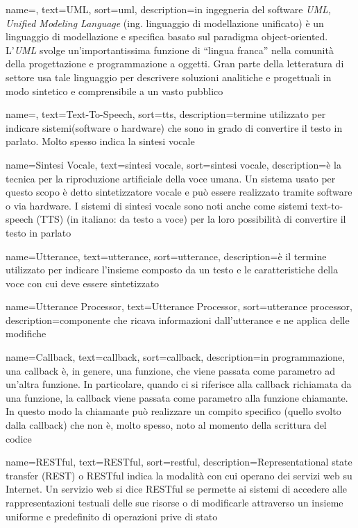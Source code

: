 {
    name=,
    text=UML,
    sort=uml,
    description={in ingegneria del software \emph{UML, Unified Modeling Language} (ing. linguaggio di modellazione unificato) è un linguaggio di modellazione e specifica basato sul paradigma object-oriented. L'\emph{UML} svolge un'importantissima funzione di ``lingua franca'' nella comunità della progettazione e programmazione a oggetti. Gran parte della letteratura di settore usa tale linguaggio per descrivere soluzioni analitiche e progettuali in modo sintetico e comprensibile a un vasto pubblico}
}

{
	name=,
	text=Text-To-Speech,
	sort=tts,
	description={termine utilizzato per indicare sistemi(software o hardware) che sono in grado di convertire il testo in parlato. Molto spesso indica la sintesi vocale}
}

{
	name=Sintesi Vocale,
	text=sintesi vocale,
	sort=sintesi vocale,
	description={è la tecnica per la riproduzione artificiale della voce umana. Un sistema usato per questo scopo è detto sintetizzatore vocale e può essere realizzato tramite software o via hardware. I sistemi di sintesi vocale sono noti anche come sistemi text-to-speech (TTS) (in italiano: da testo a voce) per la loro possibilità di convertire il testo in parlato}
}

{
	name=Utterance,
	text=utterance,
	sort=utterance,
	description={è il termine utilizzato per indicare l'insieme composto da un testo e le caratteristiche della voce con cui deve essere sintetizzato}
}

{
	name=Utterance Processor,
	text=Utterance Processor,
	sort=utterance processor,
	description={componente che ricava informazioni dall'utterance e ne applica delle modifiche}
}

{
	name=Callback,
	text=callback,
	sort=callback,
	description={in programmazione, una callback è, in genere, una funzione, che viene passata come parametro ad un'altra funzione. In particolare, quando ci si riferisce alla callback richiamata da una funzione, la callback viene passata come parametro alla funzione chiamante. In questo modo la chiamante può realizzare un compito specifico (quello svolto dalla callback) che non è, molto spesso, noto al momento della scrittura del codice}
}

{
	name=RESTful,
	text=RESTful,
	sort=restful,
	description={Representational state transfer (REST) o RESTful indica la modalità con cui operano dei servizi web su Internet. Un servizio web si dice RESTful se permette ai sistemi di accedere alle rappresentazioni testuali delle sue risorse o di modificarle attraverso un insieme uniforme e predefinito di operazioni prive di stato}
}

